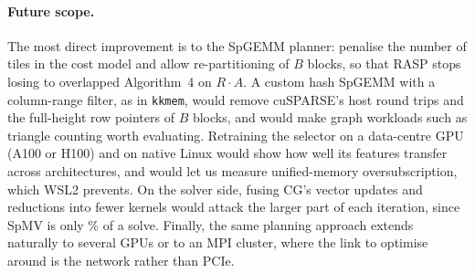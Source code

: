 \paragraph{Future scope.} The most direct improvement is to the SpGEMM planner: penalise the number of tiles in the
cost model and allow re-partitioning of $B$ blocks, so that RASP stops losing to overlapped Algorithm~4 on $R\cdot A$.
A custom hash SpGEMM with a column-range filter, as in \texttt{kkmem}, would remove cuSPARSE's host round trips and the
full-height row pointers of $B$ blocks, and would make graph workloads such as triangle counting worth evaluating.
Retraining the selector on a data-centre GPU (A100 or H100) and on native Linux would show how well its features
transfer across architectures, and would let us measure unified-memory oversubscription, which WSL2 prevents. On the
solver side, fusing CG's vector updates and reductions into fewer kernels would attack the larger part of each
iteration, since SpMV is only \% of a solve. Finally, the same planning approach extends naturally to several GPUs or to an MPI cluster, where
the link to optimise around is the network rather than PCIe.
